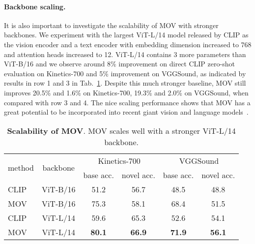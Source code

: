 \documentclass{article}
\begin{document}
\paragraph{Backbone scaling.} 
It is also important to investigate the scalability of MOV with stronger backbones. We experiment with the largest ViT-L/14 model released by CLIP as the vision encoder and a text encoder with embedding dimension increased to 768 and attention heads increased to 12. 
ViT-L/14 contains 3 more parameters than ViT-B/16 and we observe around 8\% improvement on direct CLIP zero-shot evaluation on Kinetics-700 and 5\% improvement on VGGSound, as indicated by results in row 1 and 3 in Tab.~\ref{tab:exp_modal_scaling}. 
Despite this much stronger baseline, MOV still improves 20.5\% and 1.6\% on Kinetics-700, 19.3\% and 2.0\% on VGGSound, when compared with row 3 and 4. 
The nice scaling performance shows that MOV has a great potential to be incorporated into recent giant vision and language models~\cite{yuan2021florence, yu2022coca}.  

\begin{table}[hbtp]
\begin{tabular}{lccccc}
\toprule
\multirow{2}{*}{method} & \multirow{2}{*}{backbone} & \multicolumn{2}{c}{Kinetics-700} & \multicolumn{2}{c}{VGGSound} \\
& & base acc. & novel acc. & base acc. & novel acc. \\
\midrule
CLIP~\cite{radford2021learning} & ViT-B/16 & 51.2 & 56.7 & 48.5 & 48.8 \\
MOV & ViT-B/16 & 75.3 & 58.1 & 68.4 & 51.5 \\
\hdashline
CLIP~\cite{radford2021learning} & ViT-L/14 & 59.6 & 65.3 & 52.6 & 54.1 \\
MOV & ViT-L/14 & \textbf{80.1} & \textbf{66.9} & \textbf{71.9} & \textbf{56.1} \\
\bottomrule         
\end{tabular}
\caption{\textbf{Scalability of MOV}. MOV scales well with a stronger ViT-L/14 backbone.}
\label{tab:exp_modal_scaling}
\end{table}
\end{document}
